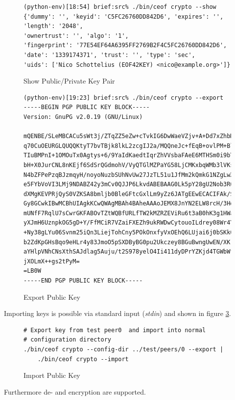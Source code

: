 \begin{figure}
\caption{Show Public/Private Key Pair}
\label{showkey}
\begin{verbatim}
(python-env)[18:54] brief:src% ./bin/ceof crypto --show
{'dummy': '', 'keyid': 'C5FC26760DD842D6', 'expires': '', 'length': '2048',
'ownertrust': '', 'algo': '1',
'fingerprint': '77E54EF64A6395FF2769B2F4C5FC26760DD842D6',
'date': '1339174371', 'trust': '', 'type': 'sec',
'uids': ['Nico Schottelius (EOF42KEY) <nico@example.org>']}
\end{verbatim}
\end{figure}
\begin{figure}
\caption{Export Public Key}
\label{exportkey}
\begin{verbatim}
(python-env)[19:23] brief:src% ./bin/ceof crypto --export
-----BEGIN PGP PUBLIC KEY BLOCK-----
Version: GnuPG v2.0.19 (GNU/Linux)

mQENBE/SLeMBCACu5sWt3j/ZTqZZ5eZw+cTvkIG6DwWaeVZjv+A+Dd7xZhbMBeyZ
q70CuOEURGLQUQQKtyT7bvTBjk8lkL2zcgIJ2a/MQQneJc+fEqB+ovlPM+Bl4qLf
TIuBMPnI+1OMOuTx0Agtys+6/9YaIdKaedtIqrZhVVsbaFAeE6MTHSm0i9bTtvyk
bH+X0JurCNL8nKEjf6SdSrQGdmohV/VyQTGlMZPaYG58LjCMKxbqWMb3lVKsmyRr
N4bZFPePzqBJzmqyH/noyoNuzbSUhNvUw27JzTL51u1JfMm2kQmkG1NZgLwXg6/W
e5FYbVoVI3LMj9NDABZ42y3mCv0QJJP6LkvdABEBAAG0Lk5pY28gU2Nob3R0ZWxp
dXMgKEVPRjQyS0VZKSA8bmljb0BleGFtcGxlLm9yZz6JATgEEwECACIFAk/SLeMC
Gy8GCwkIBwMCBhUIAgkKCwQWAgMBAh4BAheAAAoJEMX8JnYN2ELW8rcH/3Hdanzp
mUNfF7RqlU7sCwrGKFABOvTZtWQBfURLfTW2kMZRZEViRu6t3aB0hK3g1HWaSBzb
yXJmH6UznpkOG5gD+Y/FfMCiR7VZaiFXEZh9ukRWDwCytouoILdrey08Wr4YQEDf
+Ny38gLYu06Svnm25iQn3LiejTohCny5POkOnxfyVxOEhQ6LUjai6j0bSKk05o62
b2ZdKpGHsBqo9eHLr4y83JmoO5pSXDByBG0pu2Ukczey8BGuBwngUwEN/XKrl1xZ
aYHlpVNhCNsXthSAJdlag5Auju/t2S978yelO4Ii411dyDPrYZKjd4TGWbWfeVpS
jXOLmX++gs2tPyM=
=LB0W
-----END PGP PUBLIC KEY BLOCK-----
\end{verbatim}
\end{figure}
Importing keys is possible via standard input (\textit{stdin})
and shown in figure \ref{importkey}.
\begin{figure}
\caption{Import Public Key}
\label{importkey}
\begin{verbatim}
# Export key from test peer0  and import into normal
# configuration directory
./bin/ceof crypto --config-dir ../test/peers/0 --export | 
    ./bin/ceof crypto --import
\end{verbatim}
\end{figure}
Furthermore de- and encryption are supported.
